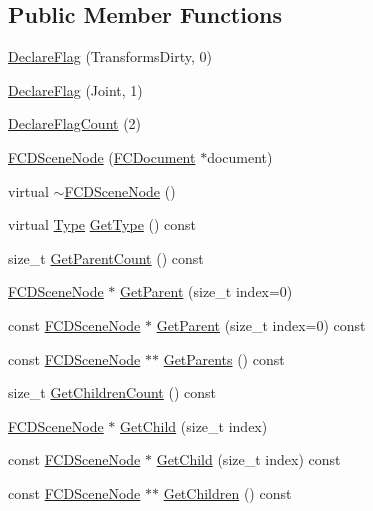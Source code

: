 \subsection*{Public Member Functions}
\begin{DoxyCompactItemize}
\item 
\hyperlink{classFCDSceneNode_ac460b0c44f59a0f74481b8575759ee32}{DeclareFlag} (TransformsDirty, 0)
\item 
\hyperlink{classFCDSceneNode_a2f96f35092cee2a7bd41026abf969398}{DeclareFlag} (Joint, 1)
\item 
\hyperlink{classFCDSceneNode_a014d704b3c4a43bd5a5031d0f09488ff}{DeclareFlagCount} (2)
\item 
\hyperlink{classFCDSceneNode_aca298791ceb66267f0c8856c404a5a92}{FCDSceneNode} (\hyperlink{classFCDocument}{FCDocument} $\ast$document)
\item 
virtual \hyperlink{classFCDSceneNode_a71261a699dc97a679e0ba35a31e06f65}{$\sim$FCDSceneNode} ()
\item 
virtual \hyperlink{classFCDEntity_a9301a4bd5f4d4190ec13e40db4effdd7}{Type} \hyperlink{classFCDSceneNode_a5dad40efa762d2cb7b3df38288c7f5aa}{GetType} () const 
\item 
size\_\-t \hyperlink{classFCDSceneNode_acce55d7e3bbcb7219e1f568ade78a33e}{GetParentCount} () const 
\item 
\hyperlink{classFCDSceneNode}{FCDSceneNode} $\ast$ \hyperlink{classFCDSceneNode_ae8d1c192e6c14a332d5e60b8956b00f5}{GetParent} (size\_\-t index=0)
\item 
const \hyperlink{classFCDSceneNode}{FCDSceneNode} $\ast$ \hyperlink{classFCDSceneNode_a95e707d6ae9e15397c5c2128e0ddea86}{GetParent} (size\_\-t index=0) const 
\item 
const \hyperlink{classFCDSceneNode}{FCDSceneNode} $\ast$$\ast$ \hyperlink{classFCDSceneNode_a383c128774398aff23dd47990511f86a}{GetParents} () const 
\item 
size\_\-t \hyperlink{classFCDSceneNode_a3d626d46b55be55ecebdb44036705c62}{GetChildrenCount} () const 
\item 
\hyperlink{classFCDSceneNode}{FCDSceneNode} $\ast$ \hyperlink{classFCDSceneNode_a4137a5a0035341285adc7ae30cf4523b}{GetChild} (size\_\-t index)
\item 
const \hyperlink{classFCDSceneNode}{FCDSceneNode} $\ast$ \hyperlink{classFCDSceneNode_a48e743198b721783eec2058f719c4c8d}{GetChild} (size\_\-t index) const 
\item 
const \hyperlink{classFCDSceneNode}{FCDSceneNode} $\ast$$\ast$ \hyperlink{classFCDSceneNode_a2f1e9396f8a6a8c150bf7c53fe76073a}{GetChildren} () const 

\end{DoxyCompactItemize}
